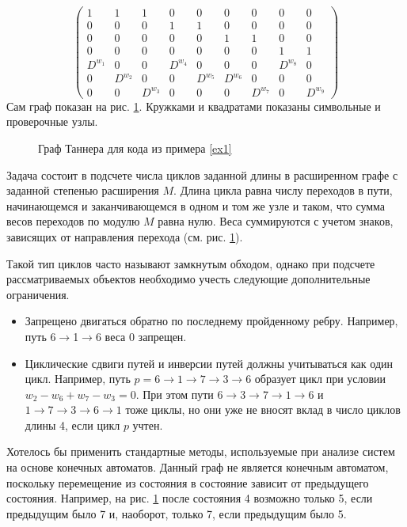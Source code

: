 \begin{example}
\[\begin{pmatrix}
1   &        1 &  1& 0 &0 & 0 &   0 &  0 &  0 \\
0   &        0 &  0& 1 &1 & 0 &   0 &  0 &  0 \\
0   &        0 &  0& 0&0 & 1 &   1 &  0 &  0 \\
0   &        0 &  0& 0 &0 & 0 &   0 &  1 &  1 \\
D^{w_{1}}&   0   &  0  & D^{w_{4}}&0 &  0 & 0                   &   D^{w_{8}} & 0\\
0          &D^{w_{2}} &0  &0&D^{w_{5}}&  D^{w_{6}}          & 0          & 0&0\\
0 & 0& D^{w_{3}}      &0         &0      &  0   &  D^{w_{7}}& 0 &D^{w_{9}}
\end{pmatrix}                                                                                                                                           
\]
Сам граф показан на рис. \ref{fig1}. 
Кружками и квадратами показаны символьные и проверочные узлы. 
\begin{figure}[!h]
  \centering
   \caption{Граф Таннера для кода из примера \ref{ex1}}
  \label{fig1}
\end{figure}

\end{example}

Задача состоит в подсчете числа циклов заданной длины в расширенном 
графе с заданной степенью расширения $M$. Длина цикла равна числу переходов в 
пути, начинающемся и заканчивающемся  в одном и том же узле и таком, что 
сумма весов переходов по модулю $M$ равна нулю. 
Веса суммируются с учетом знаков, зависящих от направления 
перехода (см. рис. \ref{fig1}).

Такой тип циклов часто называют замкнутым обходом, однако при подсчете
рассматриваемых объектов необходимо учесть следующие дополнительные ограничения.
\begin{itemize}
\item
Запрещено двигаться обратно по последнему пройденному ребру. Например,
путь  6$\to$1$\to$6 веса 0 запрещен.
\item
Циклические сдвиги путей и инверсии путей должны  учитываться как один цикл. Например, путь
$p=6\to 1 \to 7\to 3 \to 6$  образует цикл при условии $w_2-w_6+w_7-w_3=0$. При этом пути
$6 \to 3 \to 7\to 1 \to 6$ и  $1\to 7 \to 3\to 6 \to 1$ тоже циклы, но они уже не вносят
вклад в число циклов длины 4,
если цикл $p$ учтен. 
\end{itemize}

Хотелось бы применить стандартные методы, используемые при анализе систем на основе 
конечных автоматов. Данный граф не является конечным автоматом, поскольку перемещение
из состояния в состояние зависит от предыдущего состояния.  Например, на рис. \ref{fig1}
после состояния 4 возможно только 5, если предыдущим было 7 и, наоборот,
только 7, если предыдущим было 5. 

